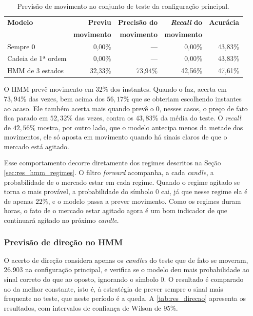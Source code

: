 \documentclass[
    12pt,                %
    openright,           %
    oneside,             %
    a4paper,             %
    english,             %
    brazil               %
]{abntex2}
\begin{document}
\begin{table}[htbp]
    \centering
    \caption{Previsão de movimento no conjunto de teste da configuração principal.}
    \label{tab:res_movimento}
    \small
    \begin{tabular}{@{}lrrrr@{}}
        \toprule
        \textbf{Modelo} & \textbf{Previu} & \textbf{Precisão do} & \textbf{\textit{Recall} do} & \textbf{Acurácia} \\
         & \textbf{movimento} & \textbf{movimento} & \textbf{movimento} & \\
        \midrule
        Sempre 0 & 0,00\% & --- & 0,00\% & 43,83\% \\
        Cadeia de 1ª ordem & 0,00\% & --- & 0,00\% & 43,83\% \\
        HMM de 3 estados & 32,33\% & 73,94\% & 42,56\% & 47,61\% \\
        \bottomrule
    \end{tabular}
\end{table}

O HMM prevê movimento em $32\%$ dos instantes. Quando o faz, acerta em $73{,}94\%$ das vezes, bem acima dos $56{,}17\%$ que se obteriam 
escolhendo instantes ao acaso. Ele também acerta mais quando prevê o $0$, nesses casos, o preço de fato fica parado em $52{,}32\%$ das vezes, 
contra os $43{,}83\%$ da média do teste. O \textit{recall} de $42{,}56\%$ mostra, por outro lado, que o modelo antecipa menos da metade dos movimentos, 
ele só aposta em movimento quando há sinais claros de que o mercado está agitado.

Esse comportamento decorre diretamente dos regimes descritos na Seção \ref{sec:res_hmm_regimes}. O filtro \textit{forward} \cite{Rabiner1989} 
acompanha, a cada \textit{candle}, a probabilidade de o mercado estar em cada regime. Quando o regime agitado se torna o mais provável, 
a probabilidade do símbolo $0$ cai, já que nesse regime ela é de apenas $22\%$, e o modelo passa a prever movimento. Como os regimes duram horas, 
o fato de o mercado estar agitado agora é um bom indicador de que continuará agitado no próximo \textit{candle}.

\subsubsection{Previsão de direção no HMM}
\label{sec:res_direcao}

O acerto de direção considera apenas os \textit{candles} do teste que de fato se moveram, 26.903 na configuração principal, e verifica se o modelo deu mais probabilidade ao 
sinal correto do que ao oposto, ignorando o símbolo $0$. O resultado é comparado ao da melhor constante, isto é, à estratégia de prever sempre 
o sinal mais frequente no teste, que neste período é a queda. A \autoref{tab:res_direcao} apresenta os resultados, com intervalos de confiança de Wilson de $95\%$.
\end{document}
